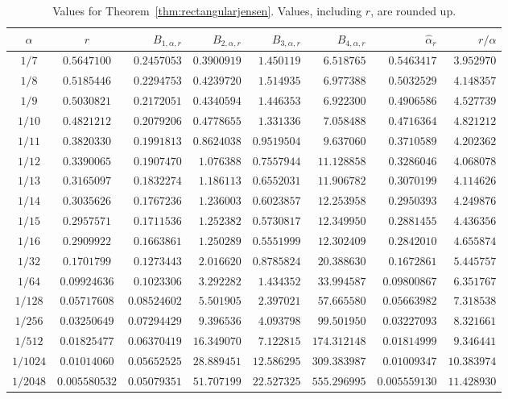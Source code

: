 \documentclass[10pt,english,letter, reqno]{amsart}
\theoremstyle{plain}
\theoremstyle{definition}
\begin{document}
\begin{table}
\caption{Values for Theorem~\ref{thm:rectangularjensen}.
Values, including $r$, are rounded up.}\label{tab:rectangularjensen}
\setlength{\tabcolsep}{3pt}\footnotesize
\begin{tabular}{|cc|rrrrr|r|}
\hline
$\alpha$&$r$&$B_{1,\alpha,r}$&$B_{2,\alpha,r}$&$B_{3,\alpha,r}$&$B_{4,\alpha,r}$&$\hat{\alpha}_r$&$r/\alpha$ \\
\hline
$ 1/7 $&$0.5647100$&$0.2457053$&$0.3900919$&$1.450119$&$6.518765$&$0.5463417$&$3.952970$\\
$ 1/8 $&$0.5185446$&$0.2294753$&$0.4239720$&$1.514935$&$6.977388$&$0.5032529$&$4.148357$\\
$ 1/9 $&$0.5030821$&$0.2172051$&$0.4340594$&$1.446353$&$6.922300$&$0.4906586$&$4.527739$\\
$ 1/10 $&$0.4821212$&$0.2079206$&$0.4778655$&$1.331336$&$7.058488$&$0.4716364$&$4.821212$\\
$ 1/11 $&$0.3820330$&$0.1991813$&$0.8624038$&$0.9519504$&$9.637060$&$0.3710589$&$4.202362$\\
$ 1/12 $&$0.3390065$&$0.1907470$&$1.076388$&$0.7557944$&$11.128858$&$0.3286046$&$4.068078$\\
$ 1/13 $&$0.3165097$&$0.1832274$&$1.186113$&$0.6552031$&$11.906782$&$0.3070199$&$4.114626$\\
$ 1/14 $&$0.3035626$&$0.1767236$&$1.236003$&$0.6023857$&$12.253958$&$0.2950393$&$4.249876$\\
$ 1/15 $&$0.2957571$&$0.1711536$&$1.252382$&$0.5730817$&$12.349950$&$0.2881455$&$4.436356$\\
$ 1/16 $&$0.2909922$&$0.1663861$&$1.250289$&$0.5551999$&$12.302409$&$0.2842010$&$4.655874$\\
$ 1/32 $&$0.1701799$&$0.1273443$&$2.016620$&$0.8785824$&$20.388630$&$0.1672861$&$5.445757$\\
$ 1/64 $&$0.09924636$&$0.1023306$&$3.292282$&$1.434352$&$33.994587$&$0.09800867$&$6.351767$\\
$ 1/128 $&$0.05717608$&$0.08524602$&$5.501905$&$2.397021$&$57.665580$&$0.05663982$&$7.318538$\\
$ 1/256 $&$0.03250649$&$0.07294429$&$9.396536$&$4.093798$&$99.501950$&$0.03227093$&$8.321661$\\
$ 1/512 $&$0.01825477$&$0.06370419$&$16.349070$&$7.122815$&$174.312148$&$0.01814999$&$9.346441$\\
$ 1/1024 $&$0.01014060$&$0.05652525$&$28.889451$&$12.586295$&$309.383987$&$0.01009347$&$10.383974$\\
$ 1/2048 $&$0.005580532$&$0.05079351$&$51.707199$&$22.527325$&$555.296995$&$0.005559130$&$11.428930$\\
\hline
\end{tabular}
\end{table}
\end{document}
